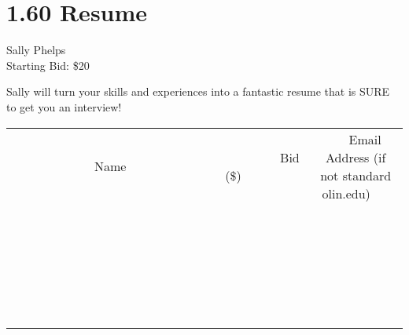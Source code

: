 \documentclass[11pt]{article}
\begin{document}
\section*{1.60 Resume}
Sally Phelps
\\
Starting Bid: \$20
\newline

Sally will turn your skills and experiences into a fantastic resume that is SURE to get you an interview!
\\[6ex]
\begin{tabular}{c c c}
~~~~~~~~~~~~~Name~~~~~~~~~~~~~ & ~~~~~~~~~Bid (\$)~~~~~~~~~  & ~~~Email Address (if not standard olin.edu)~~~\\
 & & \\
\hline
 & & \\
\hline
 & & \\
\hline
 & & \\
\hline
 & & \\
\hline
 & & \\
\hline
 & & \\
\hline
 & & \\
\hline
 & & \\
\hline
 & & \\
\hline
 & & \\
\hline
 & & \\
\hline
 & & \\
\hline
 & & \\
\hline
 & & \\
\hline
 & & \\
\hline
 & & \\
\hline
 & & \\
\hline
 & & \\
\hline
 & & \\
\hline
 & & \\
\hline
 & & \\
\hline
 & & \\
\hline
 & & \\
\hline
 & & \\
\hline
 & & \\
\hline
\end{tabular}
\newpage
\end{document}
